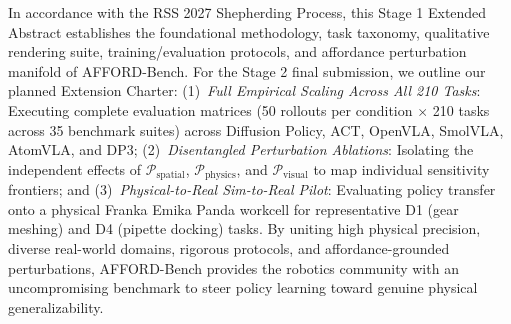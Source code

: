 \documentclass[conference]{IEEEtran}
\begin{document}
In accordance with the RSS 2027 Shepherding Process, this Stage 1 Extended Abstract establishes the foundational methodology, task taxonomy, qualitative rendering suite, training/evaluation protocols, and affordance perturbation manifold of AFFORD-Bench. For the Stage 2 final submission, we outline our planned Extension Charter:
(1)~\textit{Full Empirical Scaling Across All 210 Tasks}: Executing complete evaluation matrices (50 rollouts per condition $\times$ 210 tasks across 35 benchmark suites) across Diffusion Policy, ACT, OpenVLA, SmolVLA, AtomVLA, and DP3;
(2)~\textit{Disentangled Perturbation Ablations}: Isolating the independent effects of $\mathcal{P}_{\mathrm{spatial}}$, $\mathcal{P}_{\mathrm{physics}}$, and $\mathcal{P}_{\mathrm{visual}}$ to map individual sensitivity frontiers; and
(3)~\textit{Physical-to-Real Sim-to-Real Pilot}: Evaluating policy transfer onto a physical Franka Emika Panda workcell for representative D1 (gear meshing) and D4 (pipette docking) tasks.
By uniting high physical precision, diverse real-world domains, rigorous protocols, and affordance-grounded perturbations, AFFORD-Bench provides the robotics community with an uncompromising benchmark to steer policy learning toward genuine physical generalizability.

\clearpage


\end{document}
